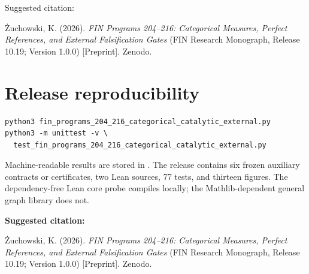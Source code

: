 \documentclass[11pt,a4paper,openany]{report}
\begin{document}
Suggested citation:

\.Zuchowski, K. (2026). \emph{FIN Programs 204--216: Categorical Measures, Perfect References, and External Falsification Gates} (FIN Research Monograph, Release 10.19; Version 1.0.0) [Preprint]. Zenodo.


\clearpage
\chapter*{Release reproducibility}
\begin{Verbatim}[fontsize=\small]
python3 fin_programs_204_216_categorical_catalytic_external.py
python3 -m unittest -v \
  test_fin_programs_204_216_categorical_catalytic_external.py
\end{Verbatim}

Machine-readable results are stored in
.
The release contains six frozen auxiliary contracts or certificates, two Lean
sources, 77 tests, and thirteen figures. The dependency-free Lean core probe
compiles locally; the Mathlib-dependent general graph library does not.

\medskip
\noindent\textbf{Suggested citation:}

\.Zuchowski, K. (2026). \emph{FIN Programs 204--216: Categorical Measures,
Perfect References, and External Falsification Gates}
(FIN Research Monograph, Release 10.19; Version 1.0.0) [Preprint]. Zenodo.
\end{document}
